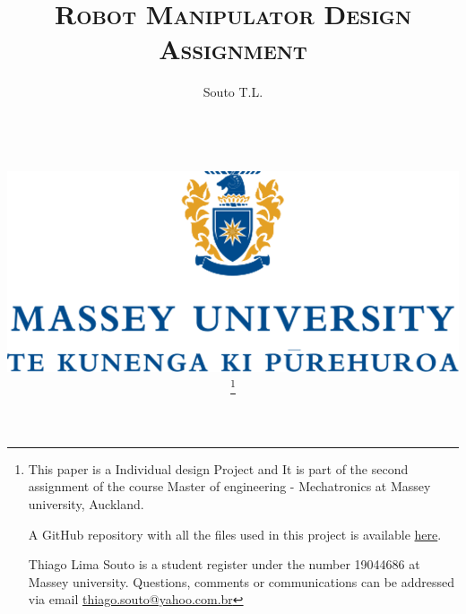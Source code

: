 \documentclass[transmag]{IEEEtran}
\begin{document}
\title{\textsc{Robot Manipulator Design Assignment}}

\clearpage\thispagestyle{empty}

\author{Souto T.L.

\\
\\
\\

\begin{centering}
\vspace{20mm}
\includegraphics[scale=0.25]{massey-png}
\end{centering}



\thanks{This paper is a Individual design Project and It is part of the second assignment of the course Master of engineering - Mechatronics at Massey university, Auckland.

A GitHub repository with all the files used in this project is available \textcolor{blue}{\href{https://github.com/ThiagoSoutoGit/Robotic-Manipulator-Files}{here}}. 

Thiago Lima Souto is a student register under the number 19044686 at Massey university. Questions, comments or communications can be addressed via email \color{blue}\href{mailto:thiago.souto@yahoo.com.br}{thiago.souto@yahoo.com.br}
}}




\end{document}
